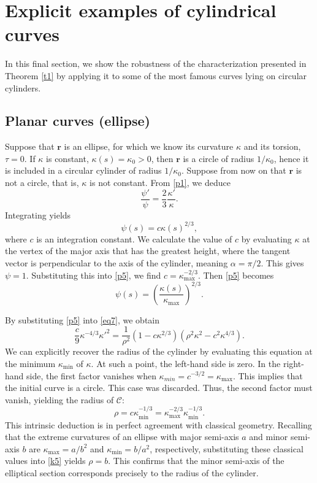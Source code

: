 \documentclass[a4paper,12pt]{amsart}
\theoremstyle{plain}
\theoremstyle{definition}
\newcommand{\bfr}{\mathbf{r}}
\def\cy{\mathcal C}
\begin{document}
 


 

 
\section{Explicit examples of cylindrical curves}\label{s4}
In this final section, we show  the robustness of the characterization presented in Theorem \ref{t1} by applying it to some of the most famous curves  lying on circular cylinders.

\subsection{Planar curves (ellipse)}   
Suppose that $\bfr$ is an ellipse, for which we know its curvature $\kappa$ and its torsion, $\tau=0$. If $\kappa$ is constant, $\kappa(s)=\kappa_0>0$, then $\bfr$ is a circle of radius $1/\kappa_0$, hence it is included in a circular cylinder of radius $1/\kappa_0$. Suppose from now on that $\bfr$ is not a circle, that is, $\kappa$ is not constant. From \eqref{p1}, we deduce   
\[ \frac{\psi'}{\psi} = \frac{2}{3} \frac{\kappa'}{\kappa}. \]
Integrating yields
\begin{equation}\label{p5}
 \psi(s) = c   \kappa(s)^{2/3}, 
 \end{equation}
where $c$ is an integration constant. We calculate the value of $c$ by evaluating $\kappa$   at the vertex of the major axis  that has the greatest height, where   the tangent vector is perpendicular to the   axis of the cylinder,  meaning $\alpha = \pi/2$. This gives   $\psi = 1$.  Substituting this into \eqref{p5}, we find $ c = \kappa_{\max}^{-2/3}$. Then  \eqref{p5} becomes
\[ \psi(s) = \left( \frac{\kappa(s)}{\kappa_{\max}} \right)^{2/3}. \]



 By substituting \eqref{p5} into \eqref{eq7}, we obtain 
\[ \frac{c}{9} \kappa^{-4/3} \kappa'^2 = \frac{1}{\rho^2} (1 - c \kappa^{2/3}) (\rho^2\kappa^2 - c^2 \kappa^{4/3}). \]
We can explicitly recover the radius of the cylinder  by evaluating this equation at the minimum $\kappa_{\min}$ of $\kappa$.  At such a point,  the left-hand side is zero. In the   right-hand side,   the first factor vanishes when $\kappa_{min} = c^{-3/2} = \kappa_{\max}$. This implies that the initial curve is a circle. This case was discarded.  Thus,  the second factor must   vanish, yielding the radius of $\cy$: 
\begin{equation}\label{k5}
\rho = c \kappa_{\min}^{-1/3}=\kappa_{\max}^{-2/3}\kappa_{\min}^{-1/3}. 
\end{equation}
This  intrinsic deduction is in perfect agreement with classical geometry. Recalling that the extreme curvatures of an ellipse with major semi-axis $a$ and minor semi-axis $b$ are   $\kappa_{\max} = a/b^2$ and $\kappa_{\min} = b/a^2$, respectively, substituting these classical values into \eqref{k5}   yields $\rho = b$. This   confirms that the minor semi-axis of the elliptical section corresponds precisely to the radius of the   cylinder. 
 
\end{document}
